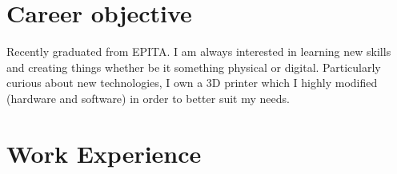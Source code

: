 \documentclass[a4paper,table]{twentysecondcv}
\begin{document}
\makeprofile{}

\vspace{-0.1cm}
\begin{center}
\end{center}
\vspace{-0.1cm}

\section{Career objective}

Recently graduated from EPITA\@. I am always interested in learning new skills
and creating things whether be it something physical or digital. Particularly
curious about new technologies, I own a 3D printer which I highly modified
(hardware and software) in order to better suit my needs.

\section{Work Experience}
\end{document}
